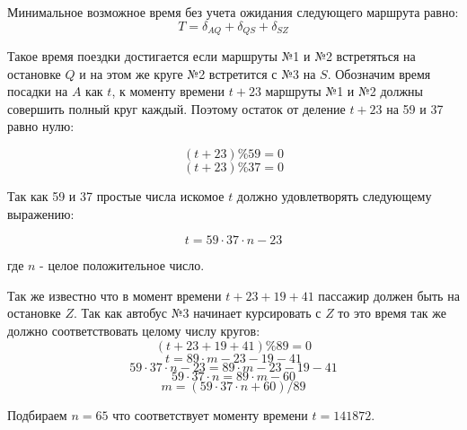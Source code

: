 \solutionSection
Минимальное возможное время без учета ожидания следующего маршрута равно:
\[ T = \delta_{AQ} + \delta_{QS} + \delta_{SZ}\]

Такое время поездки достигается если маршруты №1 и №2 встретяться на остановке $Q$ и на этом же круге №2 встретится с №3 на $S$. Обозначим время посадки на $A$ как $t$, к моменту времени $t+23$ маршруты №1 и №2 должны совершить полный круг каждый. Поэтому остаток от деление $t+23$ на 59 и 37 равно нулю:

\[ (t + 23) \% 59 = 0\]
\[ (t + 23) \% 37 = 0\]

Так как 59 и 37 простые числа искомое $t$ должно удовлетворять следующему выражению:

\[ t = 59 \cdot 37 \cdot n - 23\]

где $n$ - целое положительное число.

Так же известно что в момент времени $t+23+19+41$ пассажир должен быть на остановке $Z$. Так как автобус №3 начинает курсировать с $Z$ то это время так же должно соответствовать целому числу кругов:
\[ (t + 23 + 19 + 41) \% 89 = 0\]
\[ t = 89 \cdot m - 23 - 19 - 41\]
\[ 59 \cdot 37 \cdot n - 23 = 89 \cdot m - 23 - 19 - 41\]
\[ 59 \cdot 37 \cdot n = 89 \cdot m - 60\]
\[ m = (59 \cdot 37 \cdot n + 60)/89 \]

Подбираем $n=65$ что соответствует моменту времени $t = 141872$.


